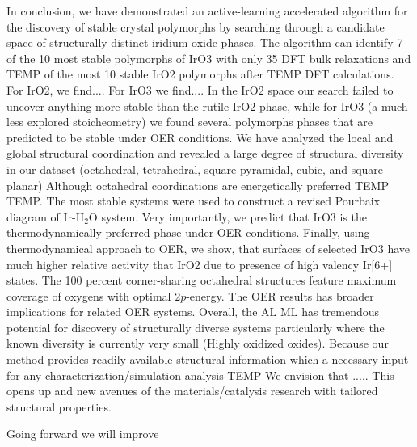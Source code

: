 

%

In conclusion, we have demonstrated an active-learning accelerated algorithm for the discovery of stable crystal polymorphs by searching through a candidate space of structurally distinct iridium-oxide phases.
The algorithm can identify 7 of the 10 most stable polymorphs of IrO3 with only 35 DFT bulk relaxations and TEMP of the most 10 stable IrO2 polymorphs after TEMP DFT calculations.
%
For IrO2, we find....  For IrO3 we find....
In the IrO2 space our search failed to uncover anything more stable than the rutile-IrO2 phase,
while for IrO3 (a much less explored stoicheometry) we found several polymorphs phases that are predicted to be stable under OER conditions.
We have analyzed the local and global structural coordination and revealed a large degree of structural diversity in our dataset (octahedral, tetrahedral, square-pyramidal, cubic, and square-planar)
Although octahedral coordinations are energetically preferred TEMP TEMP.
%
The most stable systems were used to construct a revised Pourbaix diagram of Ir-H$_2$O system.
%
Very importantly, we predict that IrO3 is the thermodynamically preferred phase under OER conditions.
%
Finally, using thermodynamical approach to OER, we show,
that surfaces of selected IrO3 have much higher relative activity that IrO2 due to presence of high valency Ir[6+] states.
%
The 100 percent corner-sharing octahedral structures feature maximum coverage of oxygens with optimal $2p$-energy.
%
The OER results has broader implications for related OER systems.
%
Overall, the AL ML has tremendous potential for discovery of structurally diverse systems particularly where the known diversity is currently very small (Highly oxidized oxides).
%
Because our method provides readily available structural information which a necessary input for any characterization/simulation analysis TEMP We envision that .....
%
This opens up and new avenues of the materials/catalysis research with tailored structural properties.


Going forward we will improve


